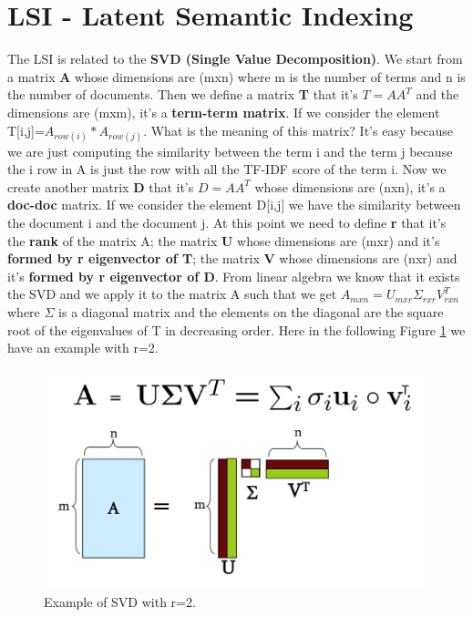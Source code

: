 \section{LSI - Latent Semantic Indexing}
The LSI is related to the \textbf{SVD (Single Value Decomposition)}.\newline
We start from a matrix \textbf{A} whose dimensions are (mxn) where m is the number of terms and n is the number of documents. Then we define a matrix \textbf{T} that it's $T=AA^T$ and the dimensions are (mxm), it's a \textbf{term-term matrix}. If we consider the element T[i,j]=$A_{row(i)}*A_{row(j)}$. What is the meaning of this matrix? It's easy because we are just computing the similarity between the term i and the term j because the i row in A is just the row with all the TF-IDF score of the term i.\newline 
Now we create another matrix \textbf{D} that it's $D=AA^T$ whose dimensions are (nxn), it's a \textbf{doc-doc} matrix. If we consider the element D[i,j] we have the similarity between the document i and the document j.\newline
At this point we need to define \textbf{r} that it's the \textbf{rank} of the matrix A; the matrix \textbf{U} whose dimensions are (mxr) and it's \textbf{formed by r eigenvector of T}; the matrix \textbf{V} whose dimensions are (nxr) and it's \textbf{formed by r eigenvector of D}.\newline
From linear algebra we know that it exists the SVD and we apply it to the matrix A such that we get $A_{mxn}=U_{mxr}\Sigma_{rxr} V^T_{rxn}$ where $\Sigma$ is a diagonal matrix and the elements on the diagonal are the square root of the eigenvalues of T in decreasing order. Here in the following Figure \ref{fig:svd2} we have an example with r=2.\newline
\begin{figure}
    \centering
    \includegraphics[width=0.75\linewidth]{images/svd2.PNG}
    \caption{Example of SVD with r=2.}
    \label{fig:svd2}
\end{figure}
